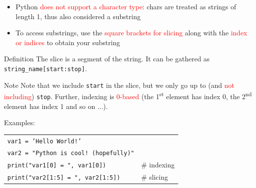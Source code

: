 \documentclass[t,handout,9pt]{beamer}
\begin{document}
\begin{frame}
\vfill
\begin{itemize}
	\item Python \textcolor{red}{does not support a character type}: chars are treated as strings of length 1, thus also considered a substring
	\item To access substrings, use the \textcolor{red}{square brackets for slicing} along with the \textcolor{red}{index or indices} to obtain your substring
\end{itemize}
\vfill
\begin{block}{Definition}
The slice is a segment of the string. It can be gathered as \texttt{string\_name[start:stop]}.
\end{block}
\begin{block}{Note}
Note that we include \texttt{start} in the slice, but we only go up to (and \textcolor{red}{not including}) \texttt{stop}. Further, indexing is \textcolor{red}{0-based} (the 1\textsuperscript{st} element has index 0, the 2\textsuperscript{nd} element has index 1 and so on ...).
\end{block}
\vfill
Examples:
\begin{table}[]
\begin{flushleft}
\begin{tabular}{ll}
\texttt{var1 = 'Hello World!'} &  \\
\texttt{var2 = "Python is cool! (hopefully)"} &  \\
\texttt{print("var1[0] = ", var1[0])} &  \# indexing\\
\texttt{print("var2[1:5] = ", var2[1:5])} &  \# slicing\\
\end{tabular}
\end{flushleft}
\end{table}
\end{frame}
%
\end{document}

